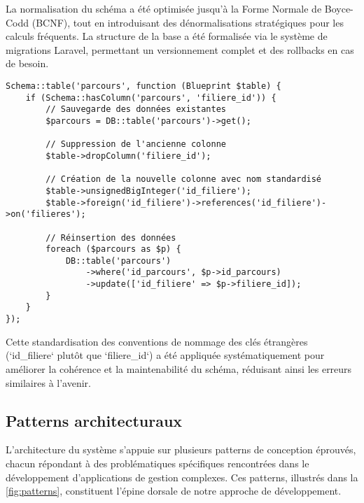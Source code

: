 \documentclass[french,12pt]{report} %
\begin{document}
La normalisation du schéma a été optimisée jusqu'à la Forme Normale de Boyce-Codd (BCNF), tout en introduisant des dénormalisations stratégiques pour les calculs fréquents. La structure de la base a été formalisée via le système de migrations Laravel, permettant un versionnement complet et des rollbacks en cas de besoin.

\begin{lstlisting}[style=phpstyle, caption={Migration - Résolution du problème filiere\_id vs id\_filiere}]
Schema::table('parcours', function (Blueprint $table) {
    if (Schema::hasColumn('parcours', 'filiere_id')) {
        // Sauvegarde des données existantes
        $parcours = DB::table('parcours')->get();
        
        // Suppression de l'ancienne colonne
        $table->dropColumn('filiere_id');
        
        // Création de la nouvelle colonne avec nom standardisé
        $table->unsignedBigInteger('id_filiere');
        $table->foreign('id_filiere')->references('id_filiere')->on('filieres');
        
        // Réinsertion des données
        foreach ($parcours as $p) {
            DB::table('parcours')
                ->where('id_parcours', $p->id_parcours)
                ->update(['id_filiere' => $p->filiere_id]);
        }
    }
});
\end{lstlisting}

Cette standardisation des conventions de nommage des clés étrangères (`id\_filiere` plutôt que `filiere\_id`) a été appliquée systématiquement pour améliorer la cohérence et la maintenabilité du schéma, réduisant ainsi les erreurs similaires à l'avenir.

\subsection{Patterns architecturaux}

L'architecture du système s'appuie sur plusieurs patterns de conception éprouvés, chacun répondant à des problématiques spécifiques rencontrées dans le développement d'applications de gestion complexes. Ces patterns, illustrés dans la \autoref{fig:patterns}, constituent l'épine dorsale de notre approche de développement.
\end{document}
